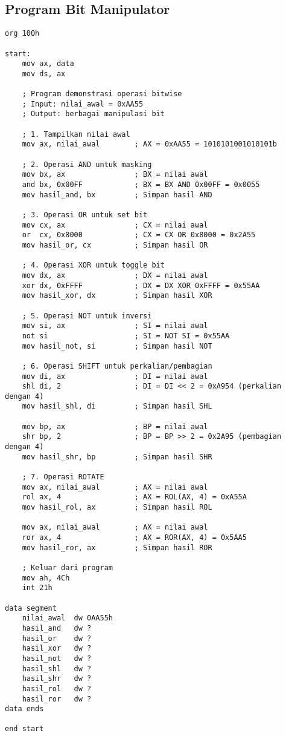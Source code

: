 \documentclass[../main.tex]{subfiles}
\begin{document}
\subsection{Program Bit Manipulator}
\begin{lstlisting}[language={[x86masm]Assembler}, caption=Program Bit Manipulator Lengkap, label={lst:bit-manipulator-program}]
org 100h

start:
    mov ax, data
    mov ds, ax
    
    ; Program demonstrasi operasi bitwise
    ; Input: nilai_awal = 0xAA55
    ; Output: berbagai manipulasi bit
    
    ; 1. Tampilkan nilai awal
    mov ax, nilai_awal        ; AX = 0xAA55 = 1010101001010101b
    
    ; 2. Operasi AND untuk masking
    mov bx, ax                ; BX = nilai awal
    and bx, 0x00FF            ; BX = BX AND 0x00FF = 0x0055
    mov hasil_and, bx         ; Simpan hasil AND
    
    ; 3. Operasi OR untuk set bit
    mov cx, ax                ; CX = nilai awal
    or  cx, 0x8000            ; CX = CX OR 0x8000 = 0x2A55
    mov hasil_or, cx          ; Simpan hasil OR
    
    ; 4. Operasi XOR untuk toggle bit
    mov dx, ax                ; DX = nilai awal
    xor dx, 0xFFFF            ; DX = DX XOR 0xFFFF = 0x55AA
    mov hasil_xor, dx         ; Simpan hasil XOR
    
    ; 5. Operasi NOT untuk inversi
    mov si, ax                ; SI = nilai awal
    not si                    ; SI = NOT SI = 0x55AA
    mov hasil_not, si         ; Simpan hasil NOT
    
    ; 6. Operasi SHIFT untuk perkalian/pembagian
    mov di, ax                ; DI = nilai awal
    shl di, 2                 ; DI = DI << 2 = 0xA954 (perkalian dengan 4)
    mov hasil_shl, di         ; Simpan hasil SHL
    
    mov bp, ax                ; BP = nilai awal
    shr bp, 2                 ; BP = BP >> 2 = 0x2A95 (pembagian dengan 4)
    mov hasil_shr, bp         ; Simpan hasil SHR
    
    ; 7. Operasi ROTATE
    mov ax, nilai_awal        ; AX = nilai awal
    rol ax, 4                 ; AX = ROL(AX, 4) = 0xA55A
    mov hasil_rol, ax         ; Simpan hasil ROL
    
    mov ax, nilai_awal        ; AX = nilai awal
    ror ax, 4                 ; AX = ROR(AX, 4) = 0x5AA5
    mov hasil_ror, ax         ; Simpan hasil ROR
    
    ; Keluar dari program
    mov ah, 4Ch
    int 21h

data segment
    nilai_awal  dw 0AA55h
    hasil_and   dw ?
    hasil_or    dw ?
    hasil_xor   dw ?
    hasil_not   dw ?
    hasil_shl   dw ?
    hasil_shr   dw ?
    hasil_rol   dw ?
    hasil_ror   dw ?
data ends

end start
\end{lstlisting}
\end{document}

